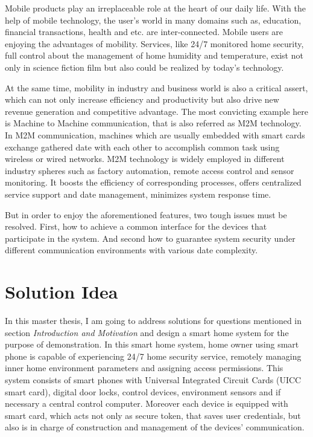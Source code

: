 \documentclass[]{llncs}
\begin{document}
Mobile products  play an irreplaceable role at the heart of our  daily life. With the help of mobile technology, the user's world in many domains such as, education, financial transactions, health and etc. are inter-connected. Mobile users are enjoying the advantages of mobility. Services, like 24/7 monitored home security, full control about the management of home humidity and temperature, exist not only in science fiction film but also could be realized by today's technology.

At the same time, mobility in industry and business world is also a critical  assert, which can not only increase efficiency and productivity but also drive new revenue generation and competitive advantage. The most convicting example here is Machine to Machine communication, that is also referred as M2M technology. In M2M communication, machines which are usually embedded with smart cards exchange gathered date with each other to accomplish common task using wireless or wired networks. M2M technology is widely employed in different industry spheres such as factory automation, remote access control and sensor monitoring. It boosts the efficiency of corresponding processes, offers centralized service support and date management, minimizes system response time.

But in order to enjoy the aforementioned features, two tough issues must be resolved. First, how to achieve a common interface for the devices that participate in the system.  And second how to guarantee system security under different communication environments with various date complexity.

\section{Solution Idea}
In this master thesis, I am going to address solutions for questions mentioned in  section \emph{Introduction and Motivation} and  design a smart home system for the purpose of demonstration. In this smart home system, home owner using smart phone is capable of experiencing 24/7 home security service, remotely managing inner home environment parameters and assigning access permissions. This system consists of smart phones with Universal Integrated Circuit Cards (UICC  smart card), digital door locks, control devices, environment sensors and if necessary a central control computer. Moreover each device is equipped with smart card, which acts  not only as secure token, that saves  user credentials, but also is in charge of  construction and management of the devices' communication.
\end{document}
